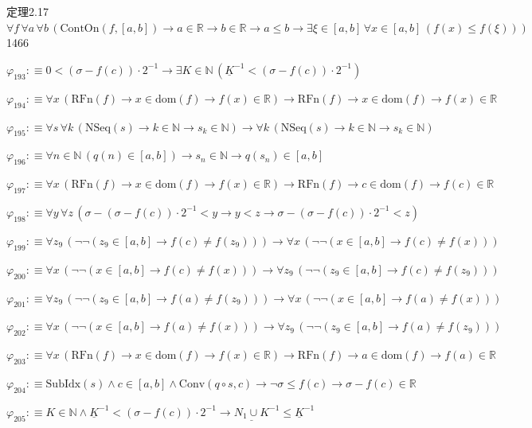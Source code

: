\begin{fullproof}{定理2.17}{$\forall f\,\forall a\,\forall b\,(\mathrm{ContOn}(f,[a,b]) \to a \in \mathbb{R} \to b \in \mathbb{R} \to a \leq b \to \exists \xi \in [a,b]\,\forall x \in [a,b]\,(f(x) \leq f(\xi)))$}{1466}
\begin{abbrevlist}
\item $\varphi_{193} :\equiv 0 < (\sigma - f(c)) \cdot 2^{-1} \to \exists K \in \mathbb{N}\,(\underline{K}^{-1} < (\sigma - f(c)) \cdot 2^{-1})$
\item $\varphi_{194} :\equiv \forall x\,(\mathrm{RFn}(f) \to x \in \mathrm{dom}(f) \to f(x) \in \mathbb{R}) \to \mathrm{RFn}(f) \to x \in \mathrm{dom}(f) \to f(x) \in \mathbb{R}$
\item $\varphi_{195} :\equiv \forall s\,\forall k\,(\mathrm{NSeq}(s) \to k \in \mathbb{N} \to s_{k} \in \mathbb{N}) \to \forall k\,(\mathrm{NSeq}(s) \to k \in \mathbb{N} \to s_{k} \in \mathbb{N})$
\item $\varphi_{196} :\equiv \forall n \in \mathbb{N}\,(q(n) \in [a,b]) \to s_{n} \in \mathbb{N} \to q(s_{n}) \in [a,b]$
\item $\varphi_{197} :\equiv \forall x\,(\mathrm{RFn}(f) \to x \in \mathrm{dom}(f) \to f(x) \in \mathbb{R}) \to \mathrm{RFn}(f) \to c \in \mathrm{dom}(f) \to f(c) \in \mathbb{R}$
\item $\varphi_{198} :\equiv \forall y\,\forall z\,(\sigma - (\sigma - f(c)) \cdot 2^{-1} < y \to y < z \to \sigma - (\sigma - f(c)) \cdot 2^{-1} < z)$
\item $\varphi_{199} :\equiv \forall z_{9}\,(\neg \neg (z_{9} \in [a,b] \to f(c) \neq f(z_{9}))) \to \forall x\,(\neg \neg (x \in [a,b] \to f(c) \neq f(x)))$
\item $\varphi_{200} :\equiv \forall x\,(\neg \neg (x \in [a,b] \to f(c) \neq f(x))) \to \forall z_{9}\,(\neg \neg (z_{9} \in [a,b] \to f(c) \neq f(z_{9})))$
\item $\varphi_{201} :\equiv \forall z_{9}\,(\neg \neg (z_{9} \in [a,b] \to f(a) \neq f(z_{9}))) \to \forall x\,(\neg \neg (x \in [a,b] \to f(a) \neq f(x)))$
\item $\varphi_{202} :\equiv \forall x\,(\neg \neg (x \in [a,b] \to f(a) \neq f(x))) \to \forall z_{9}\,(\neg \neg (z_{9} \in [a,b] \to f(a) \neq f(z_{9})))$
\item $\varphi_{203} :\equiv \forall x\,(\mathrm{RFn}(f) \to x \in \mathrm{dom}(f) \to f(x) \in \mathbb{R}) \to \mathrm{RFn}(f) \to a \in \mathrm{dom}(f) \to f(a) \in \mathbb{R}$
\item $\varphi_{204} :\equiv \mathrm{SubIdx}(s) \land c \in [a,b] \land \mathrm{Conv}(q \circ s,c) \to \neg \sigma \leq f(c) \to \sigma - f(c) \in \mathbb{R}$
\item $\varphi_{205} :\equiv K \in \mathbb{N} \land \underline{K}^{-1} < (\sigma - f(c)) \cdot 2^{-1} \to \underline{N_{1} \cup K}^{-1} \leq \underline{K}^{-1}$

\end{abbrevlist}
\end{fullproof}
